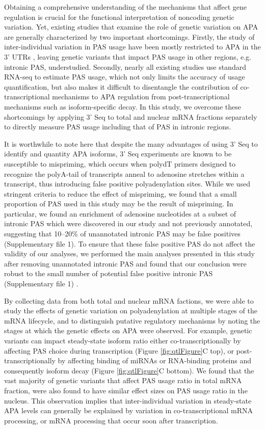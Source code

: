 Obtaining a comprehensive understanding of the mechanisms that affect gene regulation is crucial for the functional interpretation of noncoding genetic variation. Yet, existing studies that examine the role of genetic variation on APA are generally characterized by two important shortcomings. Firstly, the study of inter-individual variation in PAS usage have been mostly restricted to APA in the 3' UTRs \citep{li_genetic_2019, yoon_genetics_2012, yang_snp2apa_2019}, leaving genetic variants that impact PAS usage in other regions, e.g. intronic PAS, understudied. Secondly, nearly all existing studies use standard RNA-seq to estimate PAS usage, which not only limits the accuracy of usage quantification, but also makes it difficult to disentangle the contribution of co-transcriptional mechanisms to APA regulation from post-transcriptional mechanisms such as isoform-specific decay. In this study, we overcome these shortcomings by applying 3' Seq to total and nuclear mRNA fractions separately to directly measure PAS usage including that of PAS in intronic regions. 

It is worthwhile to note here that despite the many advantages of using 3' Seq to identify and quantity APA isoforms, 3' Seq experiments are known to be susceptible to mispriming, which occurs when polydT primers designed to recognize the polyA-tail of transcripts anneal to adenosine stretches within a transcript, thus introducing false positive polyadenylation sites. While we used stringent criteria to reduce the effect of mispriming, we found that a small proportion of PAS used in this study may be the result of mispriming. In particular, we found an enrichment of adenosine nucleotides at a subset of intronic PAS which were discovered in our study and not previously annotated, suggesting that 10--20\%{} of unannotated intronic PAS may be false positives (Supplementary file 1). To ensure that these false positive PAS do not affect the validity of our analyses, we performed the main analyses presented in this study after removing unannotated intronic PAS and found that our conclusion were robust to the small number of potential false positive intronic PAS (Supplementary file 1) \citep{wang_polya_db_2018}. 


By collecting data from both total and nuclear mRNA factions, we were able to study the effects of genetic variation on polyadenylation at multiple stages of the mRNA lifecycle, and to distinguish putative regulatory mechanisms by noting the stages at which the genetic effects on APA were observed.  For example, genetic variants can impact steady-state isoform ratio either co-transcriptionally by affecting PAS choice during transcription (Figure \ref{fig:qtlFigure}C top), or  post-transcriptionally by affecting binding of miRNAs or RNA-binding proteins and consequently isoform decay (Figure \ref{fig:qtlFigure}C bottom). We found that the vast majority of genetic variants that affect PAS usage ratio in total mRNA fraction, were also found to have similar effect sizes on PAS usage ratio in the nucleus. This observation implies that inter-individual variation in steady-state APA levels can generally be explained by variation in co-transcriptional mRNA processing, or mRNA processing that occur soon after transcription. 

